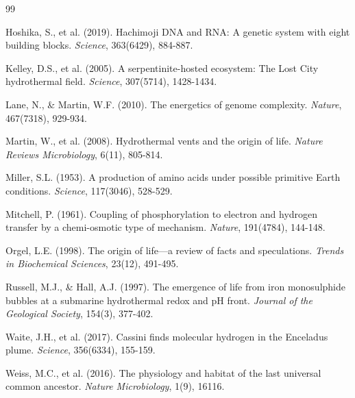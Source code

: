 \documentclass[11pt,twocolumn]{article}
\begin{document}

\begin{thebibliography}{99}

Hoshika, S., et al. (2019). Hachimoji DNA and RNA: A genetic system with eight building blocks. \textit{Science}, 363(6429), 884-887.

Kelley, D.S., et al. (2005). A serpentinite-hosted ecosystem: The Lost City hydrothermal field. \textit{Science}, 307(5714), 1428-1434.

Lane, N., \& Martin, W.F. (2010). The energetics of genome complexity. \textit{Nature}, 467(7318), 929-934.

Martin, W., et al. (2008). Hydrothermal vents and the origin of life. \textit{Nature Reviews Microbiology}, 6(11), 805-814.

Miller, S.L. (1953). A production of amino acids under possible primitive Earth conditions. \textit{Science}, 117(3046), 528-529.

Mitchell, P. (1961). Coupling of phosphorylation to electron and hydrogen transfer by a chemi-osmotic type of mechanism. \textit{Nature}, 191(4784), 144-148.

Orgel, L.E. (1998). The origin of life—a review of facts and speculations. \textit{Trends in Biochemical Sciences}, 23(12), 491-495.

Russell, M.J., \& Hall, A.J. (1997). The emergence of life from iron monosulphide bubbles at a submarine hydrothermal redox and pH front. \textit{Journal of the Geological Society}, 154(3), 377-402.

Waite, J.H., et al. (2017). Cassini finds molecular hydrogen in the Enceladus plume. \textit{Science}, 356(6334), 155-159.

Weiss, M.C., et al. (2016). The physiology and habitat of the last universal common ancestor. \textit{Nature Microbiology}, 1(9), 16116.

\end{thebibliography}
\end{document}
